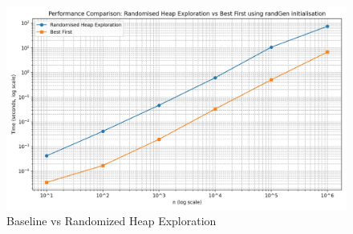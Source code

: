 \documentclass{article}
\begin{document}
\begin{figure}
    \centering
    \includegraphics[width=1\linewidth]{images/algo-comparison.jpeg}
    \caption{ Baseline vs Randomized Heap Exploration}
    \label{fig:comparison}
\end{figure}
\end{document}
